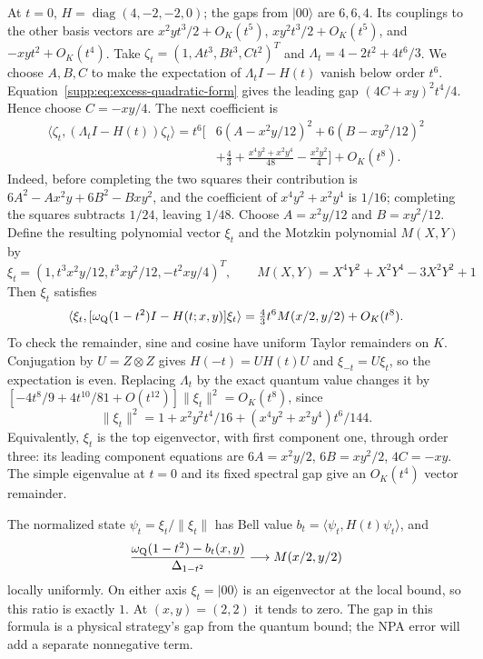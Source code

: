 \documentclass[11pt]{article}
\theoremstyle{remark}\newtheorem{remark}[theorem]{Remark}
\begin{document}
At $t=0$, $H=\operatorname{diag}(4,-2,-2,0)$; the gaps from $|00\rangle$
are $6,6,4$. Its couplings to the other basis vectors are
$x^2yt^3/2+O_K(t^5)$, $xy^2t^3/2+O_K(t^5)$, and
$-xyt^2+O_K(t^4)$. Take
$\zeta_t=(1,At^3,Bt^3,Ct^2)^T$ and
$\Lambda_t=4-2t^2+4t^6/3$.
We choose $A,B,C$ to make the expectation of $\Lambda_tI-H(t)$ vanish
below order $t^6$.
Equation~\eqref{supp:eq:excess-quadratic-form} gives the leading gap
$(4C+xy)^2t^4/4$. Hence choose $C=-xy/4$. The next coefficient is
\begin{align}
\langle\zeta_t,(\Lambda_tI-H(t))\zeta_t\rangle
=t^6\biggl[&6(A-x^2y/12)^2+6(B-xy^2/12)^2\nonumber\\
&+\tfrac43+\frac{x^4y^2+x^2y^4}{48}-\frac{x^2y^2}{4}\biggr]
+O_K(t^8).
\label{supp:eq:gap-completed-squares}
\end{align}
Indeed, before completing the two squares their contribution is
$6A^2-Ax^2y+6B^2-Bxy^2$, and the coefficient of $x^4y^2+x^2y^4$
is $1/16$; completing the squares subtracts $1/24$, leaving $1/48$.
Choose $A=x^2y/12$ and $B=xy^2/12$. Define the resulting polynomial
vector $\xi_t$ and the Motzkin polynomial $M(X,Y)$ by
\begin{equation}
\xi_t=(1,t^3x^2y/12,t^3xy^2/12,-t^2xy/4)^T,
\qquad
M(X,Y)=X^4Y^2+X^2Y^4-3X^2Y^2+1
\label{supp:eq:scaled-test-vector}
\end{equation}
Then $\xi_t$ satisfies
\begin{equation}
\langle\xi_t,[\omega_{\rm Q}(1-t^2)I-H(t;x,y)]\xi_t\rangle
=\tfrac43t^6M(x/2,y/2)+O_K(t^8).
\label{supp:eq:motzkin-limit}
\end{equation}
To check the remainder, sine and cosine have uniform Taylor remainders on
$K$. Conjugation by $U=Z\otimes Z$ gives
$H(-t)=UH(t)U$ and $\xi_{-t}=U\xi_t$, so the expectation is even.
Replacing $\Lambda_t$ by the exact quantum value changes it by
$[-4t^8/9+4t^{10}/81+O(t^{12})]\|\xi_t\|^2=O_K(t^8)$, since
\begin{equation}
\|\xi_t\|^2=1+x^2y^2t^4/16+(x^4y^2+x^2y^4)t^6/144.
\label{supp:eq:test-vector-norm}
\end{equation}
Equivalently, $\xi_t$ is the top eigenvector, with first component one,
through order three: its leading component equations are
$6A=x^2y/2$, $6B=xy^2/2$, $4C=-xy$. The simple eigenvalue at $t=0$
and its fixed spectral gap give an $O_K(t^4)$ vector remainder.

The normalized state $\psi_t=\xi_t/\|\xi_t\|$ has Bell value
$b_t=\langle\psi_t,H(t)\psi_t\rangle$, and
\begin{equation}
\frac{\omega_{\rm Q}(1-t^2)-b_t(x,y)}{\Delta_{1-t^2}}
\longrightarrow M(x/2,y/2)
\label{supp:eq:normalized-bell-gap}
\end{equation}
locally uniformly. On either axis $\xi_t=|00\rangle$ is an eigenvector
at the local bound, so this ratio is exactly $1$. At $(x,y)=(2,2)$ it
tends to zero. The gap in this formula is a physical strategy's gap from
the quantum bound; the NPA error will add a separate nonnegative term.
\end{document}
